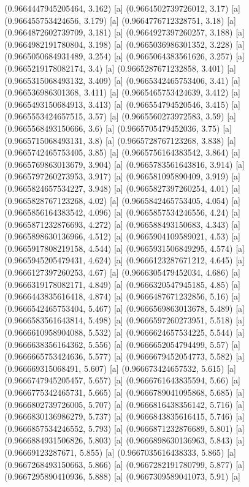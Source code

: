{{{(0.9664447945205464, 3.162) [a] 
(0.9664502739726012, 3.17) [a] 
(0.966455753424656, 3.179) [a] 
(0.9664776712328751, 3.18) [a] 
(0.9664872602739709, 3.181) [a] 
(0.9664927397260257, 3.188) [a] 
(0.9664982191780804, 3.198) [a] 
(0.9665036986301352, 3.228) [a] 
(0.9665050684931489, 3.254) [a] 
(0.9665064383561626, 3.257) [a] 
(0.9665219178082174, 3.4) [a] 
(0.9665287671232858, 3.401) [a] 
(0.9665315068493132, 3.409) [a] 
(0.9665342465753406, 3.41) [a] 
(0.966536986301368, 3.411) [a] 
(0.9665465753424639, 3.412) [a] 
(0.9665493150684913, 3.413) [a] 
(0.966554794520546, 3.415) [a] 
(0.9665553424657515, 3.57) [a] 
(0.9665560273972583, 3.59) [a] 
(0.9665568493150666, 3.6) [a] 
(0.9665705479452036, 3.75) [a] 
(0.9665715068493131, 3.8) [a] 
(0.9665728767123268, 3.838) [a] 
(0.9665742465753405, 3.85) [a] 
(0.9665756164383542, 3.864) [a] 
(0.9665769863013679, 3.904) [a] 
(0.9665783561643816, 3.914) [a] 
(0.9665797260273953, 3.917) [a] 
(0.966581095890409, 3.919) [a] 
(0.9665824657534227, 3.948) [a] 
(0.9665827397260254, 4.01) [a] 
(0.9665828767123268, 4.02) [a] 
(0.9665842465753405, 4.054) [a] 
(0.9665856164383542, 4.096) [a] 
(0.9665857534246556, 4.24) [a] 
(0.9665871232876693, 4.272) [a] 
(0.966588493150683, 4.343) [a] 
(0.9665898630136966, 4.512) [a] 
(0.9665904109589021, 4.53) [a] 
(0.9665917808219158, 4.544) [a] 
(0.9665931506849295, 4.574) [a] 
(0.9665945205479431, 4.624) [a] 
(0.9666123287671212, 4.645) [a] 
(0.9666127397260253, 4.67) [a] 
(0.9666305479452034, 4.686) [a] 
(0.9666319178082171, 4.849) [a] 
(0.9666320547945185, 4.85) [a] 
(0.9666443835616418, 4.874) [a] 
(0.9666487671232856, 5.16) [a] 
(0.9666542465753404, 5.467) [a] 
(0.9666569863013678, 5.489) [a] 
(0.9666583561643814, 5.498) [a] 
(0.9666597260273951, 5.518) [a] 
(0.9666610958904088, 5.532) [a] 
(0.9666624657534225, 5.544) [a] 
(0.9666638356164362, 5.556) [a] 
(0.9666652054794499, 5.57) [a] 
(0.9666665753424636, 5.577) [a] 
(0.9666679452054773, 5.582) [a] 
(0.966669315068491, 5.607) [a] 
(0.966673424657532, 5.615) [a] 
(0.9666747945205457, 5.657) [a] 
(0.9666761643835594, 5.66) [a] 
(0.9666775342465731, 5.665) [a] 
(0.9666789041095868, 5.685) [a] 
(0.9666802739726005, 5.707) [a] 
(0.9666816438356142, 5.716) [a] 
(0.9666830136986279, 5.737) [a] 
(0.9666843835616415, 5.746) [a] 
(0.9666857534246552, 5.793) [a] 
(0.9666871232876689, 5.801) [a] 
(0.9666884931506826, 5.803) [a] 
(0.9666898630136963, 5.843) [a] 
(0.96669123287671, 5.855) [a] 
(0.9667035616438333, 5.865) [a] 
(0.9667268493150663, 5.866) [a] 
(0.9667282191780799, 5.877) [a] 
(0.9667295890410936, 5.888) [a] 
(0.9667309589041073, 5.91) [a] 
}}}
